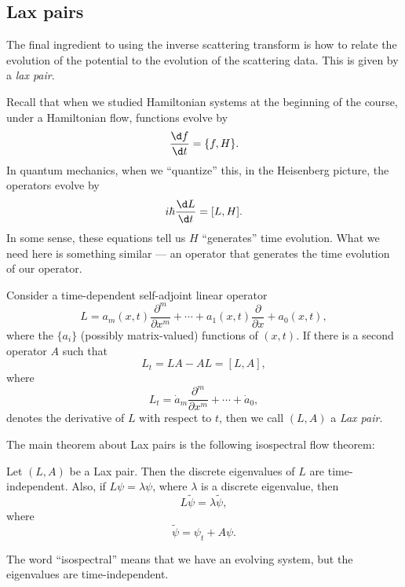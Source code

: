\documentclass[a4paper]{article}
\begin{document}
\subsection{Lax pairs}
The final ingredient to using the inverse scattering transform is how to relate the evolution of the potential to the evolution of the scattering data. This is given by a \emph{lax pair}.

Recall that when we studied Hamiltonian systems at the beginning of the course, under a Hamiltonian flow, functions evolve by
\[
  \frac{\d f}{\d t} = \{f, H\}.
\]
In quantum mechanics, when we ``quantize'' this, in the Heisenberg picture, the operators evolve by
\[
  i\hbar \frac{\d L}{\d t} = [L, H].
\]
In some sense, these equations tell us $H$ ``generates'' time evolution. What we need here is something similar --- an operator that generates the time evolution of our operator.
\begin{defi}
  Consider a time-dependent self-adjoint linear operator
  \[
    L = a_m (x, t) \frac{\partial^m}{\partial x^m} + \cdots + a_1 (x, t) \frac{\partial}{\partial x} + a_0(x, t),
  \]
  where the $\{a_i\}$ (possibly matrix-valued) functions of $(x, t)$. If there is a second operator $A$ such that
  \[
    L_t = LA - AL = [L, A],
  \]
  where
  \[
    L_t = \dot{a}_m \frac{\partial^m}{\partial x^m} + \cdots + \dot{a}_0,
  \]
  denotes the derivative of $L$ with respect to $t$, then we call $(L, A)$ a \emph{Lax pair}.
\end{defi}

The main theorem about Lax pairs is the following isospectral flow theorem:
\begin{thm}
  Let $(L, A)$ be a Lax pair. Then the discrete eigenvalues of $L$ are time-independent. Also, if $L\psi = \lambda \psi$, where $\lambda$ is a discrete eigenvalue, then
  \[
    L \tilde{\psi} = \lambda \tilde{\psi},
  \]
  where
  \[
    \tilde{\psi} = \psi_t + A \psi.
  \]
\end{thm}
The word ``isospectral'' means that we have an evolving system, but the eigenvalues are time-independent.
\end{document}

